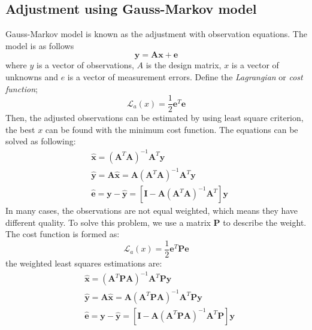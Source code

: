 \subsection{Adjustment using Gauss-Markov model}\label{sec:Gaussmarkov}
Gauss-Markov model is known as the adjustment with observation equations. The model is as follows
\begin{equation}
\bm{y} = \bm{A}\bm{x} + \bm{e}
\end{equation}
where $y$ is a vector of observations, $A$ is the design matrix, $x$ is a vector of unknowns and $e$ is a vector of measurement errors. Define the \textit{Lagrangian} or \textit{cost function};
\begin{equation}
\mathcal{L}_{a}(x) = \frac{1}{2} \bm{e}^T \bm{e}
\end{equation} 
Then, the adjusted observations can be estimated by using least square criterion, the best $x$ can be found with the minimum cost function. The equations can be solved as following:
\begin{align}
&\hat{\bm{x}} = (\bm{A}^T\bm{A})^{-1}\bm{A}^T\bm{y}\\
&\hat{\bm{y}} = \bm{A}\hat{\bm{x}} = \bm{A}(\bm{A}^T\bm{A})^{-1}\bm{A}^T\bm{y}\\
&\hat{\bm{e}} = \bm{y} - \hat{\bm{y}} = [\bm{I} - \bm{A}(\bm{A}^T\bm{A})^{-1}\bm{A}^T]\bm{y}
\end{align}
In many cases, the observations are not equal weighted, which means they have different quality. To solve this problem,  we use a matrix $\bm{P}$ to describe the weight. The cost function is formed as:
\begin{equation}
\mathcal{L}_{a}(x) = \frac{1}{2} \bm{e}^T \bm{P}\bm{e}
\end{equation}
the weighted least squares estimations are:
\begin{align}
&\hat{\bm{x}} = (\bm{A}^T \bm{P}\bm{A})^{-1}\bm{A}^T\bm{P}\bm{y}\\
&\hat{\bm{y}} = \bm{A}\hat{\bm{x}} = \bm{A}(\bm{A}^T\bm{P}\bm{A})^{-1}\bm{A}^T\bm{P}\bm{y}\\
&\hat{\bm{e}} = \bm{y} - \hat{\bm{y}} = [\bm{I} - \bm{A}(\bm{A}^T\bm{P}\bm{A})^{-1}\bm{A}^T\bm{P}]\bm{y}
\end{align}
